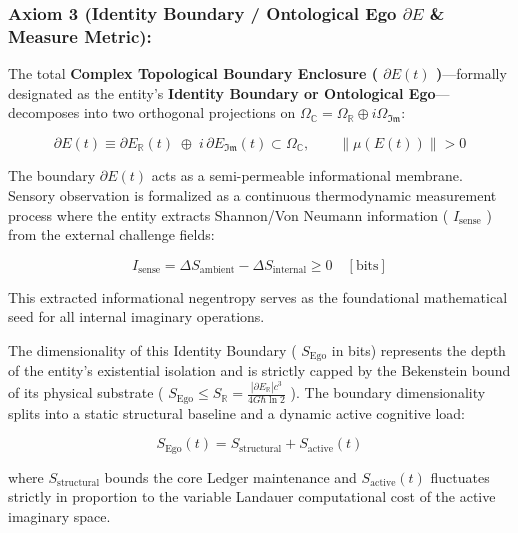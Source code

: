 \documentclass[11pt,a4paper]{article}
\theoremstyle{definition}
\theoremstyle{remark}
\begin{document}
\subsubsection{Axiom 3 (Identity Boundary / Ontological Ego $\partial E$ \& Measure Metric):}
The total \textbf{Complex Topological Boundary Enclosure ( $\partial E(t)$ )}—formally designated as the entity's \textbf{Identity Boundary or Ontological Ego}—decomposes into two orthogonal projections on $\Omega_{\mathbb{C}} = \Omega_{\mathbb{R}} \oplus i \Omega_{\mathfrak{Im}}$:


\begin{equation}
\boxed{\partial E(t) \equiv \partial E_{\mathbb{R}}(t) \;\oplus\; i \, \partial E_{\mathfrak{Im}}(t) \subset \Omega_{\mathbb{C}}, \qquad \|\mu(E(t))\| > 0}
\end{equation}


The boundary $\partial E(t)$ acts as a semi-permeable informational membrane. Sensory observation is formalized as a continuous thermodynamic measurement process where the entity extracts Shannon/Von Neumann information ( $I_{\text{sense}}$ ) from the external challenge fields:


\begin{equation}
\boxed{I_{\text{sense}} = \Delta S_{\text{ambient}} - \Delta S_{\text{internal}} \ge 0 \quad [\mathrm{bits}]}
\end{equation}


This extracted informational negentropy serves as the foundational mathematical seed for all internal imaginary operations.

The dimensionality of this Identity Boundary ( $S_{\text{Ego}}$ in bits) represents the depth of the entity's existential isolation and is strictly capped by the Bekenstein bound of its physical substrate ( $S_{\text{Ego}} \le S_{\mathbb{R}} = \frac{|\partial E_{\mathbb{R}}|c^3}{4G\hbar\ln 2}$ ). The boundary dimensionality splits into a static structural baseline and a dynamic active cognitive load:


\begin{equation}
\boxed{S_{\text{Ego}}(t) = S_{\text{structural}} + S_{\text{active}}(t)}
\end{equation}


where $S_{\text{structural}}$ bounds the core Ledger maintenance and $S_{\text{active}}(t)$ fluctuates strictly in proportion to the variable Landauer computational cost of the active imaginary space.
\end{document}
